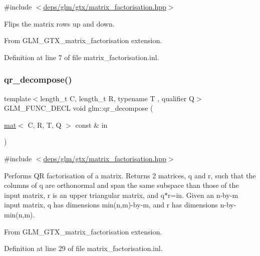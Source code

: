 {\ttfamily \#include $<$\hyperlink{matrix__factorisation_8hpp}{deps/glm/gtx/matrix\+\_\+factorisation.\+hpp}$>$}

Flips the matrix rows up and down.

From G\+L\+M\+\_\+\+G\+T\+X\+\_\+matrix\+\_\+factorisation extension. 

Definition at line 7 of file matrix\+\_\+factorisation.\+inl.

\mbox{\label{group__gtx__matrix__factorisation_ga77022dca1aa38add548f9f56a9f8071a}} 
\subsubsection{\texorpdfstring{qr\+\_\+decompose()}{qr\_decompose()}}
{\footnotesize\ttfamily template$<$length\+\_\+t C, length\+\_\+t R, typename T , qualifier Q$>$ \\
G\+L\+M\+\_\+\+F\+U\+N\+C\+\_\+\+D\+E\+CL void glm\+::qr\+\_\+decompose (\begin{DoxyParamCaption}\item[{\hyperlink{structglm_1_1mat}{mat}$<$ C, R, T, Q $>$ const \&}]{in }\end{DoxyParamCaption})}



{\ttfamily \#include $<$\hyperlink{matrix__factorisation_8hpp}{deps/glm/gtx/matrix\+\_\+factorisation.\+hpp}$>$}

Performs QR factorisation of a matrix. Returns 2 matrices, q and r, such that the columns of q are orthonormal and span the same subspace than those of the input matrix, r is an upper triangular matrix, and q$\ast$r=in. Given an n-\/by-\/m input matrix, q has dimensions min(n,m)-\/by-\/m, and r has dimensions n-\/by-\/min(n,m).

From G\+L\+M\+\_\+\+G\+T\+X\+\_\+matrix\+\_\+factorisation extension. 

Definition at line 29 of file matrix\+\_\+factorisation.\+inl.

\mbox{\label{group__gtx__matrix__factorisation_ga4e022709c9e7eaad9d7cc315d2cdb05c}} 
